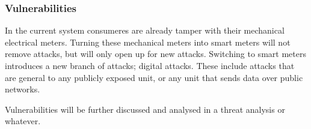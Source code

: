 \subsubsection{Vulnerabilities}
In the current system consumeres are already tamper with their mechanical electrical meters.
Turning these mechanical meters into smart meters will not remove attacks, but will only open up for new attacks.
Switching to smart meters introduces a new branch of attacks; digital attacks.
These include attacks that are general to any publicly exposed unit, or any unit that sends data over public networks.

Vulnerabilities will be further discussed and analysed in a threat analysis or whatever.
